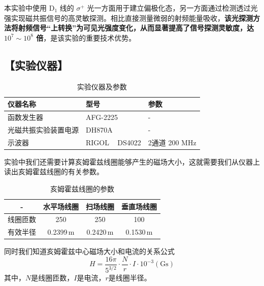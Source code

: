 \documentclass[12pt,a4paper,UTF8]{ctexart}
\begin{document}
本实验中使用 $\mathrm{D}_1$ 线的 $\sigma^+$ 光一方面用于建立偏极化态，另一方面通过检测透过光强实现磁共振信号的高灵敏探测。相比直接测量微弱的射频能量吸收，\textbf{该光探测方法将射频信号“上转换”为可见光强度变化，从而显著提高了信号探测灵敏度，达 $10^7 \sim 10^8$ 倍}，是该实验的重要技术优势。

\subsection*{【实验仪器】}
\begin{table}[h!]
	\centering
	\begin{tabular}{|p{5cm} p{4cm} p{5cm}|}
		\hline
		仪器名称 & 型号 & 参数 \\
		\hline\hline
		函数发生器 & AFG-2225 & - \\
		
		光磁共振实验装置电源 & DH870A & - \\
		
		示波器 & RIGOL ~ DS4022 & 2通道 200 MHz \\
		\hline		
	\end{tabular}
	\caption{实验仪器及参数}
	\label{tab:instruments}
\end{table}
    实验中我们还需要计算亥姆霍兹线圈能够产生的磁场大小，这就需要我们从仪器上读出亥姆霍兹线圈的有关参数。
\begin{table}[h!]
    \centering
    \caption{亥姆霍兹线圈的参数}
    \begin{tabular}{|c|c|c|c|}
        \hline
         - & 水平场线圈 & 扫场线圈 & 垂直场线圈 \\
        \hline
        线圈匝数 & 250 & 250 & 100 \\
        \hline
        有效半径 & 0.2399$\,\mathrm{m}$ & 0.2420$\,\mathrm{m}$ & 0.1530$\,\mathrm{m}$ \\
        \hline
    \end{tabular}
\end{table}

同时我们知道亥姆霍兹中心磁场大小和电流的关系公式
\[
H = \frac{16\pi}{5^{3/2}} \cdot \frac{N}{r} \cdot I \cdot 10^{-3} \left(\mathrm{Gs}\right)
\]
其中，$N$是线圈匝数，$I$是电流，$r$是线圈半径。
\end{document}
